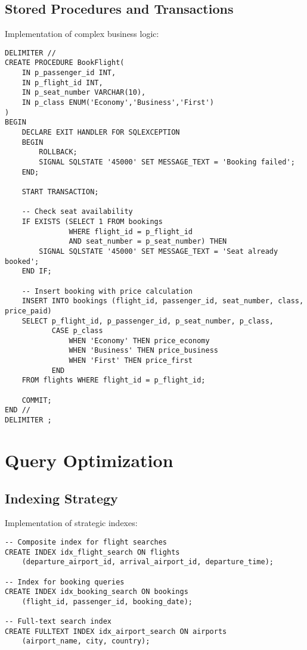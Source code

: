 \documentclass[a4paper,12pt]{article}
\begin{document}
\subsection{Stored Procedures and Transactions}
Implementation of complex business logic:

\begin{lstlisting}[caption=Transaction Management]
DELIMITER //
CREATE PROCEDURE BookFlight(
    IN p_passenger_id INT,
    IN p_flight_id INT,
    IN p_seat_number VARCHAR(10),
    IN p_class ENUM('Economy','Business','First')
)
BEGIN
    DECLARE EXIT HANDLER FOR SQLEXCEPTION
    BEGIN
        ROLLBACK;
        SIGNAL SQLSTATE '45000' SET MESSAGE_TEXT = 'Booking failed';
    END;
    
    START TRANSACTION;
    
    -- Check seat availability
    IF EXISTS (SELECT 1 FROM bookings 
               WHERE flight_id = p_flight_id 
               AND seat_number = p_seat_number) THEN
        SIGNAL SQLSTATE '45000' SET MESSAGE_TEXT = 'Seat already booked';
    END IF;
    
    -- Insert booking with price calculation
    INSERT INTO bookings (flight_id, passenger_id, seat_number, class, price_paid)
    SELECT p_flight_id, p_passenger_id, p_seat_number, p_class,
           CASE p_class
               WHEN 'Economy' THEN price_economy
               WHEN 'Business' THEN price_business
               WHEN 'First' THEN price_first
           END
    FROM flights WHERE flight_id = p_flight_id;
    
    COMMIT;
END //
DELIMITER ;
\end{lstlisting}

\section{Query Optimization}
\subsection{Indexing Strategy}
Implementation of strategic indexes:

\begin{lstlisting}[caption=Index Implementation]
-- Composite index for flight searches
CREATE INDEX idx_flight_search ON flights 
    (departure_airport_id, arrival_airport_id, departure_time);

-- Index for booking queries
CREATE INDEX idx_booking_search ON bookings 
    (flight_id, passenger_id, booking_date);

-- Full-text search index
CREATE FULLTEXT INDEX idx_airport_search ON airports 
    (airport_name, city, country);
\end{lstlisting}
\end{document}
